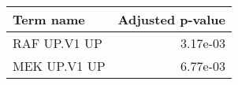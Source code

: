 \begin{tabular}{lr}
\toprule
   Term name &  Adjusted p-value \\
\midrule
RAF UP.V1 UP &          3.17e-03 \\
MEK UP.V1 UP &          6.77e-03 \\
\bottomrule
\end{tabular}
